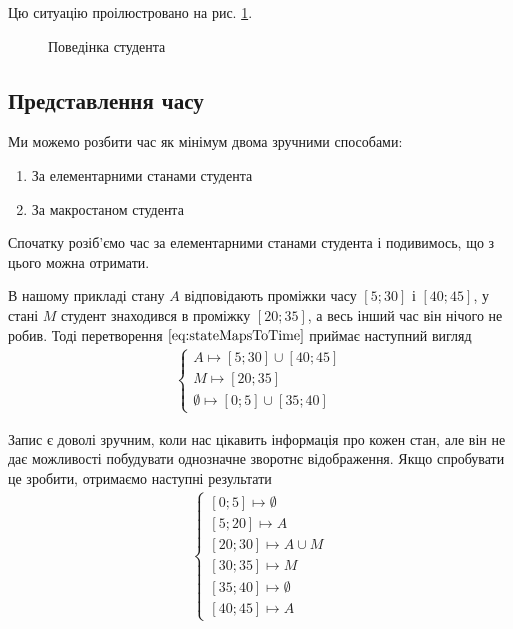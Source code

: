 Цю ситуацію проілюстровано на рис. \ref{fig:tikz:studentBehaviorSimple}.

\begin{figure}%
  \center
  \caption{Поведінка студента}
  \label{fig:tikz:studentBehaviorSimple}
\end{figure}

\subsection{Представлення часу}
Ми можемо розбити час як мінімум двома зручними способами:
\begin{enumerate}
  \item
    За елементарними станами студента
  \item
    За макростаном студента
\end{enumerate}

Спочатку розіб’ємо час за елементарними станами студента і подивимось, що з
цього можна отримати.

В нашому прикладі стану $A$ відповідають проміжки часу $\left[ 5; 30 \right]$ і
$\left[ 40; 45 \right]$, у стані $M$ студент знаходився в проміжку
$\left[ 20; 35 \right]$, а весь інший час він нічого не робив.
Тоді перетворення $\eqref{eq:stateMapsToTime}$ приймає наступний вигляд
\begin{align*}
  \begin{cases}
    A \mapsto \left[ 5; 30 \right] \cup \left[ 40; 45 \right] \\
    M \mapsto \left[ 20; 35 \right] \\
    \emptyset \mapsto \left[ 0; 5 \right] \cup \left[ 35; 40 \right]
  \end{cases}
\end{align*}

Запис є доволі зручним, коли нас цікавить інформація про кожен стан, але він
не дає можливості побудувати однозначне зворотнє відображення.
Якщо спробувати це зробити, отримаємо наступні результати
\begin{align}\label{eq:timeToStateMapsExample}
  \begin{cases}
    \left[ 0; 5 \right] \mapsto \emptyset \\
    \left[ 5; 20 \right] \mapsto A \\
    \left[ 20; 30 \right] \mapsto A \cup M \\
    \left[ 30; 35 \right] \mapsto M \\
    \left[ 35; 40 \right] \mapsto \emptyset \\
    \left[ 40; 45 \right] \mapsto A
  \end{cases}
\end{align}

